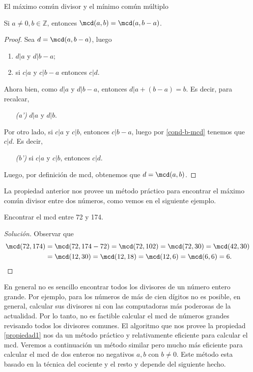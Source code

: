 \begin{section}{El máximo común divisor y el mínimo común
múltiplo}
\begin{propiedad}\label{propiedad1}
    Si $a \not=0, b \in \mathbb Z$, entonces $\mcd(a,b) = \mcd(a,b-a)$. 
\end{propiedad}
\begin{proof}
    Sea $d =  \mcd(a,b-a)$, luego 
    \begin{enumerate}[label=\textit{\alph*)}]
        \item $ d|a$ y $d|b -a$;
        \item\label{cond-b-mcd} si $ c|a $ y $c|b -a$ entonces $ c|d$.
    \end{enumerate}
    Ahora bien, como  $ d|a$ y $d|b -a$, entonces $  d|a +(b -a) = b$. Es decir, para recalcar,
    \begin{enumerate}
        \item[\textit{(a')}] $ d|a$ y $d|b$.
    \end{enumerate}
    Por otro lado, si  $ c|a $ y $c|b$, entonces  $c|b -a$, luego por \ref{cond-b-mcd} tenemos que $c|d$. Es decir, 
    \begin{enumerate}
        \item[\textit{(b')}]si  $ c|a $ y $c|b$, entonces  $c|d$.
    \end{enumerate}
    Luego, por definición de mcd, obtenemos que $d = \mcd(a,b)$.
\end{proof}

La propiedad anterior nos provee un método práctico para encontrar el máximo común divisor entre dos números, como vemos en el siguiente ejemplo.

\begin{ejemplo*} Encontrar el mcd entre 72 y 174.
    \begin{proof}[Solución] Observar que 
        \begin{align*}
        \mcd(72, 174) &= \mcd(72,174-72) = \mcd(72,102) = \mcd(72,30) =  \mcd(42, 30) \\&= \mcd(12,30) = \mcd(12,18)= \mcd(12,6)= \mcd(6,6) = 6.  
        \end{align*}
    \end{proof}
\end{ejemplo*} 

En  general no es sencillo encontrar todos los divisores de un número entero grande. Por ejemplo, para los  números de más de cien dígitos no es posible,  en general, calcular sus divisores ni con las computadoras más poderosas de la actualidad. Por  lo tanto, no es factible calcular el  mcd de números grandes revisando todos los divisores comunes.  El algoritmo que nos provee la  propiedad \ref{propiedad1} nos da un método práctico y relativamente eficiente para calcular el mcd. Veremos a continuación un método similar pero mucho más eficiente para calcular el mcd de dos enteros no negativos $a,b$ con $b \not=0$. Este método esta basado en la técnica del cociente y el resto y depende del siguiente hecho.


\end{section}
